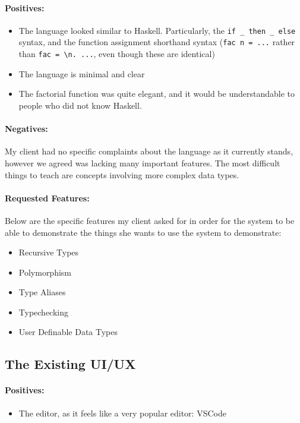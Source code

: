 \paragraph{Positives:}
\begin{itemize}
    \item The language looked similar to Haskell. Particularly, the \verb|if _ then _ else| syntax, and the function assignment shorthand syntax (\verb|fac n = ...| rather than \verb|fac = \n. ...|, even though these are identical)
    \item The language is minimal and clear
    \item The factorial function was quite elegant, and it would be understandable to people who did not know Haskell.  
\end{itemize}

\paragraph{Negatives:}
My client had no specific complaints about the language as it currently stands, however we agreed was lacking many important features. The most difficult things to teach are concepts involving more complex data types. 

\paragraph{Requested Features:}
Below are the specific features my client asked for in order for the system to be able to demonstrate the things she wants to use the system to demonstrate:
\begin{itemize}
    \item Recursive Types
    \item Polymorphism
    \item Type Aliases
    \item Typechecking
    \item User Definable Data Types
\end{itemize}

\subsection{The Existing UI/UX}
\paragraph{Positives:}
\begin{itemize}
    \item The editor, as it feels like a very popular editor: VSCode
\end{itemize}

